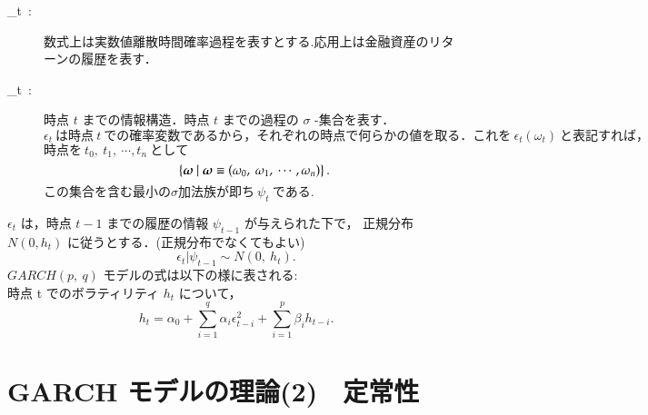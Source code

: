 \documentclass[slide,10pt]{jsarticle}
\def\vector#1{\mbox{\boldmath $#1$}}
\def\sheet #1{\section*{\centering \large \bfseries #1}}
\begin{document}
{\huge
\begin{description}
	\item[{\Huge \epsilon_t}\ :\ ] 数式上は実数値離散時間確率過程を表すとする.応用上は金融資産のリターンの履歴を表す．
	\item[{\Huge \psi_t}\ :\ ] 時点 $t$ までの情報構造．時点 $t$ までの過程の $\sigma$ -集合を表す．\\
		$\epsilon_t\ は時点\ t\ での確率変数であるから，それぞれの時点で何らかの値を取る．これを\ \epsilon_t(\omega_t)\ と表記すれば，$
		$時点を\ t_0,\ t_1,\ \cdots,t_n\ として$
		\[
			\left\{\vector{\omega}\ |\ \vector{\omega} \equiv (\omega_0,\ \omega_1,\ \cdots,\omega_n) \right\}.
		\]
		$この集合を含む最小の \sigma 加法族が即ち\ \psi_t\ である.$
\end{description}
$\epsilon_t$ は，時点 $t-1$ までの履歴の情報 $\psi_{t-1}$ が与えられた下で， 正規分布 $N(0, h_t)$ に従うとする．(正規分布でなくてもよい)
\[
	\epsilon_t|\psi_{t-1} \sim N(0,\ h_t).
\]
$GARCH(p,\ q)$ モデルの式は以下の様に表される: \\
\qquad 時点 t でのボラティリティ $h_t$ について，
\[
	h_t = \alpha_0 + \sum_{i=1}^{q} \alpha_i \epsilon_{t-i}^2 + \sum_{i=1}^{p} \beta_i h_{t-i}.
\]
}

\sheet{\Huge GARCH モデルの理論(2)　定常性}
\end{document}
